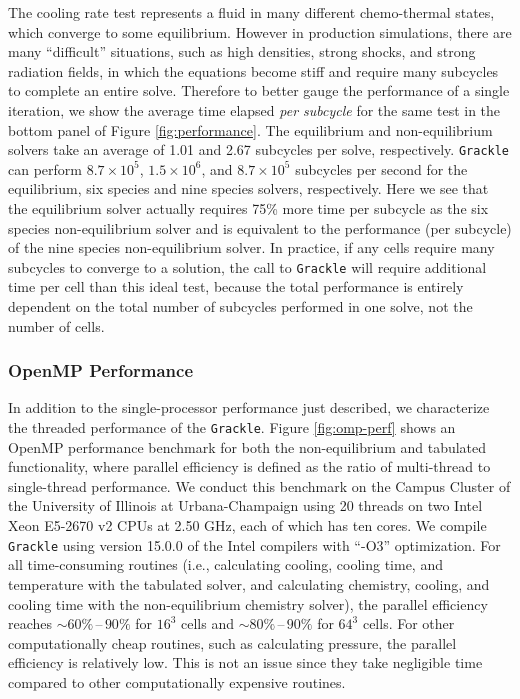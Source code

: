 The cooling rate test represents a fluid in many different
chemo-thermal states, which converge to some equilibrium.  However in
production simulations, there are many ``difficult'' situations, such
as high densities, strong shocks, and strong radiation fields, in
which the equations become stiff and require many subcycles to
complete an entire solve.  Therefore to better gauge the performance
of a single iteration, we show the average time elapsed {\it per
  subcycle} for the same test in the bottom panel of Figure
\ref{fig:performance}.  The equilibrium and non-equilibrium solvers
take an average of 1.01 and 2.67 subcycles per solve, respectively.
\texttt{Grackle} can perform $8.7 \times 10^5$, $1.5 \times 10^6$, and $8.7
\times 10^5$ subcycles per second for the equilibrium, six species and
nine species solvers, respectively.  Here we see that the equilibrium
solver actually requires 75\% more time per subcycle as the six species
non-equilibrium solver and is equivalent to the performance (per
subcycle) of the nine species non-equilibrium solver.  In practice, if
any cells require many subcycles to converge to a solution, the call
to \texttt{Grackle} will require additional time per cell than this ideal test,
because the total performance is entirely dependent on the total
number of subcycles performed in one solve, not the number of cells.

\subsubsection{OpenMP Performance}

In addition to the single-processor performance just described, we
characterize the threaded performance of the \texttt{Grackle}.
Figure \ref{fig:omp-perf} shows an OpenMP performance benchmark for both the
non-equilibrium and tabulated functionality, where parallel efficiency is
defined as the ratio of multi-thread to single-thread performance. We
conduct this benchmark on the Campus Cluster of the University of Illinois
at Urbana-Champaign using 20 threads on two Intel Xeon E5-2670 v2 CPUs
at 2.50 GHz, each of which has ten cores. We compile \texttt{Grackle}
using version 15.0.0 of the Intel compilers with ``-O3''
optimization.  For all time-consuming routines
(i.e., calculating cooling, cooling time, and temperature with the tabulated
solver, and calculating chemistry, cooling, and cooling time with the
non-equilibrium chemistry solver), the parallel efficiency reaches
$\sim 60\%\,\text{--}\,90\%$ for $16^3$ cells and
$\sim 80\%\,\text{--}\,90\%$ for $64^3$ cells. For other computationally cheap
routines, such as calculating pressure, the parallel efficiency is relatively
low. This is not an issue since they take negligible time compared to other
computationally expensive routines.

